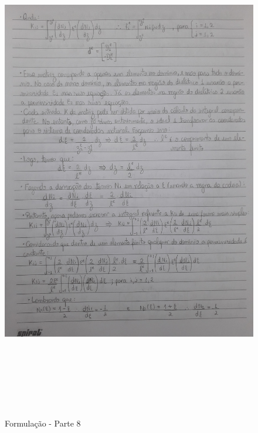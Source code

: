 \documentclass[10pt]{article}
\begin{document}
    \begin{figure}[!htb]
    \centerline{\includegraphics[width=20cm,height=22cm]{Formulação Matemática/Formulacao - Parte 8.jpg}}
    \caption{Formulação - Parte 8}
    \label{fig:fp8}
    \end{figure}
    
\end{document}
